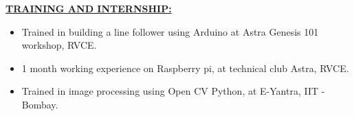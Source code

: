 \documentclass[letterpaper,11pt,oneside]{article}
\begin{document}
    \vspace{2ex}
    
    \textbf{\underline{\Large TRAINING AND INTERNSHIP:}}
    \begin{itemize}
    	\item Trained in building a line follower using Arduino at Astra Genesis 101 workshop, RVCE.
    	\item 1 month working experience on Raspberry pi, at technical club Astra, RVCE.
    	\item Trained in image processing using Open CV Python, at E-Yantra, IIT - Bombay.	
    \end{itemize}
\end{document}
